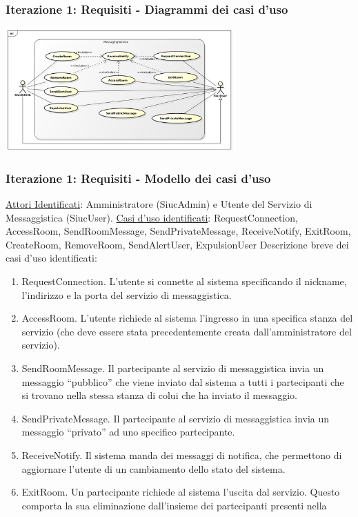 \documentclass[t]{beamer} %
\let\olditem=\item%
\renewcommand{\item}{\olditem \justifying}%
\begin{document}
\begin{frame}
  \frametitle{Iterazione 1: Requisiti - Diagrammi dei casi d'uso}
    \includegraphics[height=178px, width=330px,]{image_astah/UseCaseDiagram.png}{\centering}
\end{frame}

\begin{frame} [allowframebreaks]
  \frametitle{Iterazione 1: Requisiti - Modello dei casi d'uso}
   \underline{Attori Identificati}: Amministratore (SiucAdmin) e Utente del Servizio di Messaggistica (SiucUser). \newline
   \underline{Casi d'uso identificati}: RequestConnection, AccessRoom, SendRoomMessage, SendPrivateMessage, ReceiveNotify, ExitRoom, CreateRoom, RemoveRoom, 
                                        SendAlertUser, ExpulsionUser \newline
   Descrizione breve dei casi d'uso identificati:
   \begin{enumerate} 
    \item RequestConnection. L’utente si connette al sistema specificando il nickname, l’indirizzo e la porta del servizio di messaggistica.
    \item AccessRoom. L’utente richiede al sistema l’ingresso in una specifica stanza del servizio (che deve essere stata precedentemente creata dall’amministratore 
          del servizio). 
    \item SendRoomMessage. Il partecipante al servizio di messaggistica invia un messaggio ``pubblico'' che viene inviato dal sistema a tutti i partecipanti che si 
          trovano nella stessa stanza di colui che ha inviato il messaggio.
    \item SendPrivateMessage. Il partecipante al servizio di messaggistica  invia un messaggio ``privato'' ad uno specifico partecipante.
    \item ReceiveNotify. Il sistema manda dei messaggi di notifica, che permettono di aggiornare l’utente di un cambiamento dello stato del sistema.
    \item ExitRoom. Un partecipante richiede al sistema l’uscita dal servizio. Questo comporta la sua eliminazione dall’insieme dei partecipanti presenti nella 

\end{enumerate}
\end{frame}
\end{document}
